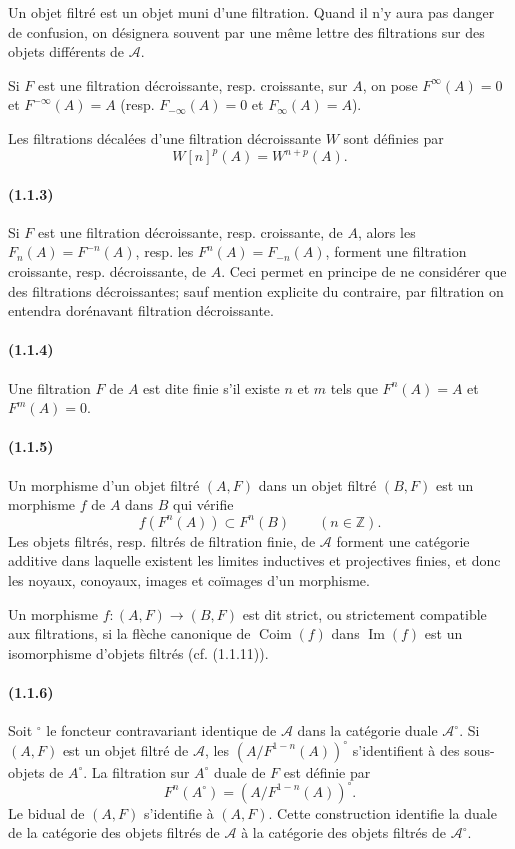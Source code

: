 \documentclass[10pt]{article}
\newcommand{\Z}{\mathbb Z}
\newcommand{\Coim}{\operatorname{Coim}}
\newcommand{\Imop}{\operatorname{Im}}
\newcommand{\fg}{\guillemotright}
\newcommand{\og}{\guillemotleft}
\newcommand{\calA}{\mathcal A}
\begin{document}
Un objet filtré est un objet muni d'une filtration. Quand il n'y aura pas danger de confusion, on désignera souvent par une même lettre des filtrations sur des objets différents de $\calA$.

Si $F$ est une filtration décroissante, resp. croissante, sur $A$, on pose $F^\infty(A)=0$ et $F^{-\infty}(A)=A$ (resp. $F_{-\infty}(A)=0$ et $F_{\infty}(A)=A$).

Les filtrations décalées d'une filtration décroissante $W$ sont définies par
\[
W[n]^p(A)=W^{n+p}(A).
\]

\paragraph{(1.1.3)} Si $F$ est une filtration décroissante, resp. croissante, de $A$, alors les $F_n(A)=F^{-n}(A)$, resp. les $F^n(A)=F_{-n}(A)$, forment une filtration croissante, resp. décroissante, de $A$. Ceci permet en principe de ne considérer que des filtrations décroissantes; sauf mention explicite du contraire, par \og filtration\fg{} on entendra dorénavant \og filtration décroissante\fg{}.

\paragraph{(1.1.4)} Une filtration $F$ de $A$ est dite finie s'il existe $n$ et $m$ tels que $F^n(A)=A$ et $F^m(A)=0$.

\paragraph{(1.1.5)} Un morphisme d'un objet filtré $(A,F)$ dans un objet filtré $(B,F)$ est un morphisme $f$ de $A$ dans $B$ qui vérifie
\[
f(F^n(A))\subset F^n(B)\qquad(n\in\Z).
\]
Les objets filtrés, resp. filtrés de filtration finie, de $\calA$ forment une catégorie additive dans laquelle existent les limites inductives et projectives finies, et donc les noyaux, conoyaux, images et coïmages d'un morphisme.

Un morphisme $f:(A,F)\to(B,F)$ est dit strict, ou strictement compatible aux filtrations, si la flèche canonique de $\Coim(f)$ dans $\Imop(f)$ est un isomorphisme d'objets filtrés (cf. (1.1.11)).

\paragraph{(1.1.6)} Soit ${}^{\circ}$ le foncteur contravariant identique de $\calA$ dans la catégorie duale $\calA^{\circ}$. Si $(A,F)$ est un objet filtré de $\calA$, les $(A/F^{1-n}(A))^{\circ}$ s'identifient à des sous-objets de $A^{\circ}$. La filtration sur $A^{\circ}$ duale de $F$ est définie par
\[
F^n(A^{\circ})=(A/F^{1-n}(A))^{\circ}.
\]
Le bidual de $(A,F)$ s'identifie à $(A,F)$. Cette construction identifie la duale de la catégorie des objets filtrés de $\calA$ à la catégorie des objets filtrés de $\calA^{\circ}$.
\end{document}
